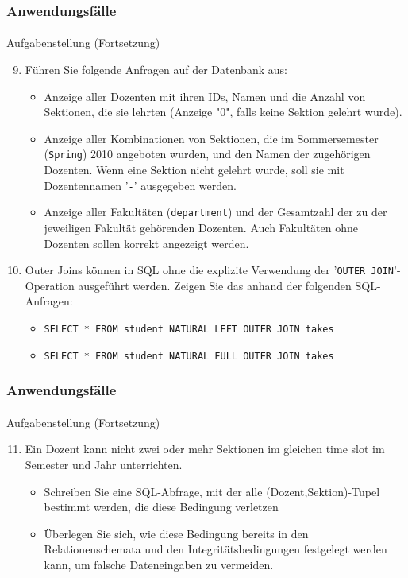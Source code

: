 \begin{frame}[t]
\frametitle{Anwendungsf\"alle}
\framesubtitle{\insertsubsection}
\begin{alertblock}{Aufgabenstellung (Fortsetzung)}
\begin{enumerate}
 \setcounter{enumi}{8}	
 \item\label{U4} F\"uhren Sie folgende Anfragen auf der Datenbank aus: 
  \begin{itemize}
   \item Anzeige aller Dozenten mit ihren IDs, Namen und die Anzahl von Sektionen, die sie lehrten (Anzeige "0", falls 
    keine Sektion gelehrt wurde). 
   \item Anzeige aller Kombinationen von Sektionen, die im Sommersemester (\texttt{Spring}) 2010 angeboten wurden, 
    und den Namen der zugeh\"origen Dozenten. Wenn eine Sektion nicht gelehrt wurde, soll sie mit Dozentennamen 
    '\texttt{-}' ausgegeben werden.
   \item Anzeige aller Fakult\"aten (\texttt{department}) und der Gesamtzahl der zu der jeweiligen Fakult\"at
    geh\"orenden Dozenten. Auch Fakult\"aten ohne Dozenten sollen korrekt angezeigt werden.    	
  \end{itemize}
 \item\label{U5} Outer Joins k\"onnen in SQL ohne die explizite Verwendung der '\texttt{OUTER JOIN}'-Operation ausgef\"uhrt werden.
  Zeigen Sie das anhand der folgenden SQL-Anfragen:
  \begin{itemize}
   \item \texttt{SELECT * FROM student NATURAL LEFT OUTER JOIN takes}
   \item \texttt{SELECT * FROM student NATURAL FULL OUTER JOIN takes}
  \end{itemize}
\end{enumerate}
\end{alertblock}
\end{frame}

\begin{frame}[t]
\frametitle{Anwendungsf\"alle}
\framesubtitle{\insertsubsection}
\begin{alertblock}{Aufgabenstellung (Fortsetzung)}
\begin{enumerate}
 \setcounter{enumi}{10}	
 \item\label{U6} Ein Dozent kann nicht zwei oder mehr Sektionen im gleichen time slot im Semester und Jahr unterrichten. 
  \begin{itemize}
   \item Schreiben Sie eine SQL-Abfrage, mit der alle (Dozent,Sektion)-Tupel bestimmt werden, die diese Bedingung verletzen
   \item \"Uberlegen Sie sich, wie diese Bedingung bereits in den Relationenschemata und den Integrit\"atsbedingungen
    festgelegt werden kann, um falsche Dateneingaben zu vermeiden.
  \end{itemize}
\end{enumerate}
\end{alertblock}
\end{frame}
